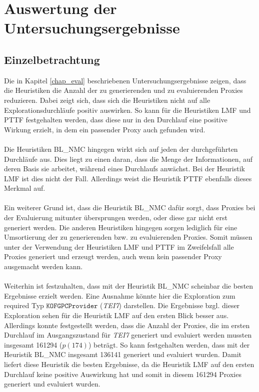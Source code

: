 \section{Auswertung der Untersuchungsergebnisse}
\subsection{Einzelbetrachtung}\label{disc_einzel}
Die in Kapitel \ref{chap_eval} beschriebenen Untersuchungsergebnisse zeigen, dass die Heuristiken die Anzahl der zu generierenden und zu evaluierenden Proxies reduzieren. Dabei zeigt sich, dass sich die Heuristiken nicht auf alle Explorationsdurchläufe positiv auswirken. So kann für die Heuristiken LMF und PTTF festgehalten werden, dass diese nur in den Durchlauf eine positive Wirkung erzielt, in dem ein passender Proxy auch gefunden wird.
\\\\
Die Heuristiken BL\_NMC hingegen wirkt sich auf jeden der durchgeführten Durchläufe aus. Dies liegt zu einen daran, dass die Menge der Informationen, auf deren Basis sie arbeitet, während eines Durchlaufs anwächst. Bei der Heuristik LMF ist dies nicht der Fall. Allerdings weist die Heuristik PTTF ebenfalls dieses Merkmal auf.
\\\\
Ein weiterer Grund ist, dass die Heuristik BL\_NMC dafür sorgt, dass Proxies bei der Evaluierung mitunter übersprungen werden, oder diese gar nicht erst generiert werden. Die anderen Heuristiken hingegen sorgen lediglich für eine Umsortierung der zu generierenden bzw. zu evaluierenden Proxies. Somit müssen unter der Verwendung der Heuristiken LMF und PTTF im Zweifelsfall alle Proxies generiert und erzeugt werden, auch wenn kein passender Proxy ausgemacht werden kann.
\\\\
Weiterhin ist festzuhalten, dass mit der Heuristik BL\_NMC scheinbar die besten Ergebnisse erzielt werden. Eine Ausnahme könnte hier die Exploration zum required Typ $\texttt{KOFGPCProvider}$ (\emph{TEI7}) darstellen. Die Ergebnisse bzgl. dieser Exploration sehen für die Heuristik LMF auf den ersten Blick besser aus. Allerdings konnte festgestellt werden, dass die Anzahl der Proxies, die im ersten Durchlauf im Ausgangszustand für \emph{TEI7} generiert und evaluiert werden mussten insgesamt 161294 ($\mathit{p(174)}$) beträgt. So kann festgehalten werden, dass mit der Heuristik BL\_NMC insgesamt 136141 generiert und evaluiert wurden. Damit liefert diese Heuristik die besten Ergebnisse, da die Heuristik LMF auf den ersten Durchlauf keine positive Auswirkung hat und somit in diesem 161294 Proxies generiert und evaluiert wurden.
